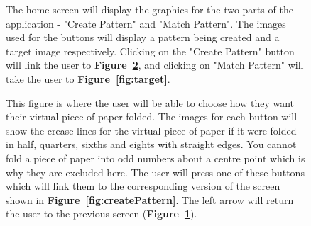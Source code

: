 \documentclass[11pt]{article}
\begin{document}
\begin{figure}
\begin{minipage}[c]{0.35\textwidth}
                \end{minipage}\hfill
                \begin{minipage}[c]{0.65\textwidth}
                \caption{The home screen will display the graphics for the two parts of the application - "Create Pattern" and "Match Pattern". The images used for the buttons will display a pattern being created and a target image respectively. Clicking on the "Create Pattern" button will link the user to \textbf{Figure~\ref{fig:chooseFold}}, and clicking on "Match Pattern" will take the user to \textbf{Figure~\ref{fig:target}}.}
                \label{fig:homeScreen}
                \end{minipage}
            \end{figure}
            \begin{figure}
                \begin{minipage}[c]{0.65\textwidth}
                \caption{This figure is where the user will be able to choose how they want their virtual piece of paper folded. The images for each button will show the crease lines for the virtual piece of paper if it were folded in half, quarters, sixths and eights with straight edges. You cannot fold a piece of paper into odd numbers about a centre point which is why they are excluded here. The user will press one of these buttons which will link them to the corresponding version of the screen shown in \textbf{Figure~\ref{fig:createPattern}}. The left arrow will return the user to the previous screen (\textbf{Figure~\ref{fig:homeScreen}}).}
                \label{fig:chooseFold}
                \end{minipage}\hfill
                \begin{minipage}[c]{0.35\textwidth}

\end{minipage}
\end{figure}
\end{document}
